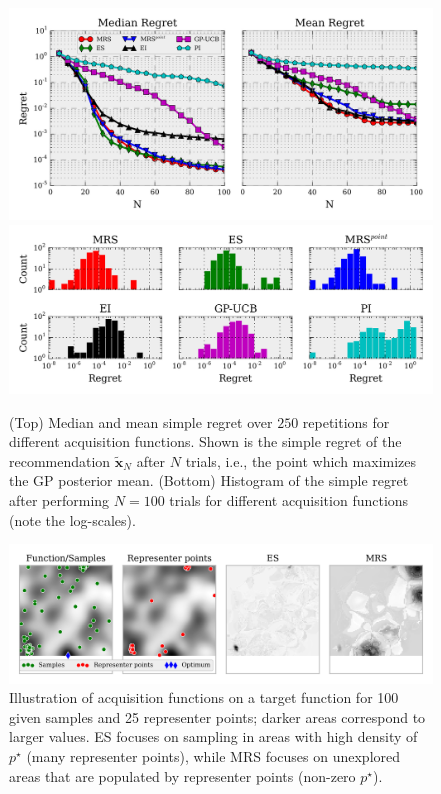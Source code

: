 \documentclass[10pt,letterpaper]{article} %
\begin{document}
\begin{figure}
\centering
\includegraphics[width=.9\textwidth]{empirical_comparison}
\includegraphics[width=.9\textwidth]{hist}
\caption{(Top) Median and mean simple regret over $250$ repetitions for different acquisition functions. Shown is the simple regret of the recommendation $\mathbf{\tilde x}_N$ after $N$ trials, i.e., the point which maximizes the GP posterior
mean. (Bottom) Histogram of the simple regret after performing $N=100$ trials for different acquisition functions (note the log-scales).}
\label{fig:empirical_comparison}
\end{figure}

\begin{figure}
\centering
\includegraphics[width=.9\textwidth]{es_analysis}
\caption{Illustration of acquisition functions on a target function for
100 given samples and 25 representer points; darker areas correspond to larger values. ES focuses on sampling in areas with high density of $p^\star$ (many representer points), while MRS focuses on unexplored areas that are populated by representer points (non-zero $p^\star$).
}
\label{fig:es_analysis}
\end{figure}
\end{document}

